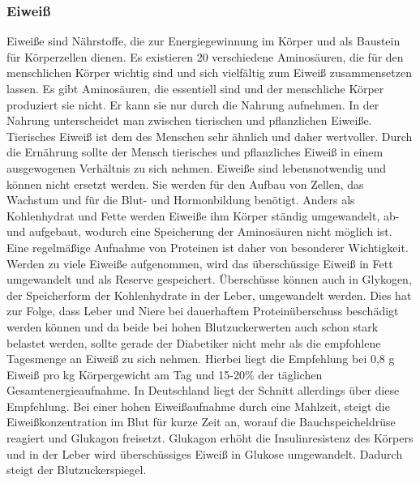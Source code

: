 	\subsubsection{Eiweiß}
		Eiweiße sind Nährstoffe, die zur Energiegewinnung im Körper und als Baustein für Körperzellen dienen. Es existieren 20 verschiedene Aminosäuren, die für den menschlichen Körper wichtig sind und sich vielfältig zum Eiweiß zusammensetzen lassen. Es gibt Aminosäuren, die essentiell sind und der menschliche Körper produziert sie nicht. Er kann sie nur durch die Nahrung aufnehmen. In der Nahrung unterscheidet man zwischen tierischen und pflanzlichen Eiweiße. Tierisches Eiweiß ist dem des Menschen sehr ähnlich und daher wertvoller. Durch die Ernährung sollte der Mensch tierisches und pflanzliches Eiweiß in einem ausgewogenen Verhältnis zu sich nehmen. Eiweiße sind lebensnotwendig und können nicht ersetzt werden. \cite{ND} Sie werden für den Aufbau von Zellen, das Wachstum und für die Blut- und Hormonbildung benötigt. \newline
		Anders als Kohlenhydrat und Fette werden Eiweiße ihm Körper ständig umgewandelt, ab- und aufgebaut, wodurch eine Speicherung der Aminosäuren nicht möglich ist. Eine regelmäßige Aufnahme von Proteinen ist daher von besonderer Wichtigkeit. \newline
		Werden zu viele Eiweiße aufgenommen, wird das überschüssige Eiweiß in Fett umgewandelt und als Reserve gespeichert. Überschüsse können auch in Glykogen, der Speicherform der Kohlenhydrate in der Leber, umgewandelt werden. Dies hat zur Folge, dass Leber und Niere bei dauerhaftem Proteinüberschuss beschädigt werden können und da beide bei hohen Blutzuckerwerten auch schon stark belastet werden, sollte gerade der Diabetiker nicht mehr als die empfohlene Tagesmenge an Eiweiß zu sich nehmen. \cite{SG} Hierbei liegt die Empfehlung bei 0,8 g Eiweiß pro kg Körpergewicht am Tag und 15-20\% der täglichen Gesamtenergieaufnahme. In Deutschland liegt der Schnitt allerdings über diese Empfehlung. \cite{ND} Bei einer hohen Eiweißaufnahme durch eine Mahlzeit, steigt die Eiweißkonzentration im Blut für kurze Zeit an, worauf die Bauchspeicheldrüse reagiert und Glukagon freisetzt. Glukagon erhöht die Insulinresistenz des Körpers und in der Leber wird überschüssiges Eiweiß in Glukose umgewandelt. Dadurch steigt der Blutzuckerspiegel. \cite{SG}
